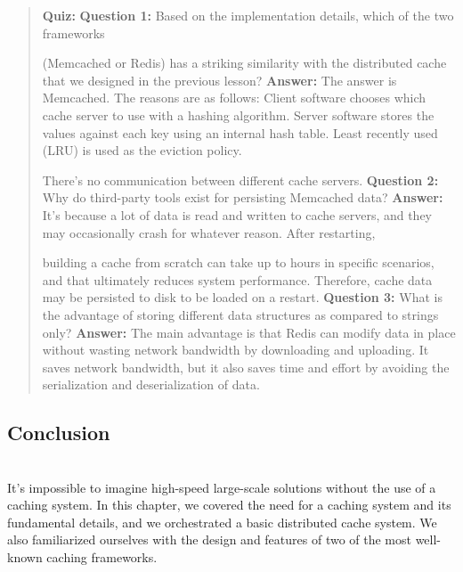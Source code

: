 \begin{quote}
\textbf{Quiz:}
\textbf{Question 1:} Based on the implementation details, which of the two frameworks

(Memcached or Redis) has a striking similarity with the distributed cache that we designed in the previous lesson?
\textbf{Answer:} The answer is Memcached. The reasons are as follows: Client software chooses which cache server to use with a hashing algorithm. Server software stores the values against each key using an internal hash table. Least recently used (LRU) is used as the eviction policy.

There's no communication between different cache servers.
\textbf{Question 2:} Why do third-party tools exist for persisting Memcached data?
\textbf{Answer:} It's because a lot of data is read and written to cache servers, and they may occasionally crash for whatever reason. After restarting,

building a cache from scratch can take up to hours in specific scenarios, and that ultimately reduces system performance. Therefore, cache data may be persisted to disk to be loaded on a restart.
\textbf{Question 3:} What is the advantage of storing different data structures as compared to strings only?
\textbf{Answer:} The main advantage is that Redis can modify data in place without wasting network bandwidth by downloading and uploading. It saves network bandwidth, but it also saves time and effort by avoiding the serialization and deserialization of data.
\end{quote}

\subsection{Conclusion}\label{BywEvPf3LPnjzWij7-aD6}
\\
\hfill\break
It's impossible to imagine high-speed large-scale solutions without the use of a caching system. In this chapter, we covered the need for a caching system and its fundamental details, and we orchestrated a basic distributed cache system. We also familiarized ourselves with the design and features of two of the most well-known caching frameworks.

